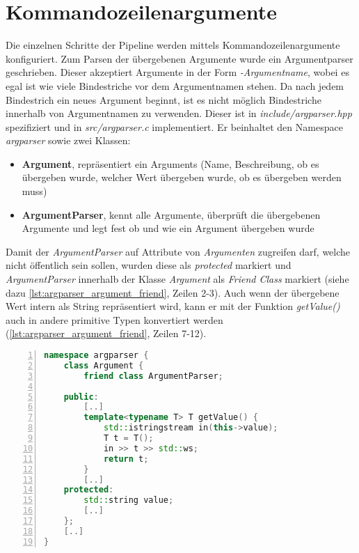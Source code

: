 \section{Kommandozeilenargumente}
Die einzelnen Schritte der Pipeline werden mittels Kommandozeilenargumente konfiguriert.
Zum Parsen der übergebenen Argumente wurde ein Argumentparser geschrieben.
Dieser akzeptiert Argumente in der Form \emph{-Argumentname}, wobei es egal ist wie viele Bindestriche vor dem Argumentnamen stehen.
Da nach jedem Bindestrich ein neues Argument beginnt, ist es nicht möglich Bindestriche innerhalb von Argumentnamen zu verwenden.
Dieser ist in \emph{include/argparser.hpp} spezifiziert und in \emph{src/argparser.c} implementiert.
Er beinhaltet den Namespace \emph{argparser} sowie zwei Klassen:
\begin{itemize}
\item \textbf{Argument}, repräsentiert ein Arguments (Name, Beschreibung, ob es übergeben wurde, welcher Wert übergeben wurde, ob es übergeben werden muss)
\item \textbf{ArgumentParser}, kennt alle Argumente, überprüft die übergebenen Argumente und legt fest ob und wie ein Argument übergeben wurde
\end{itemize}

Damit der \emph{ArgumentParser} auf Attribute von \emph{Argumenten} zugreifen darf, welche nicht öffentlich sein sollen, wurden diese als \emph{protected} markiert und \emph{ArgumentParser} innerhalb der Klasse \emph{Argument} als \emph{Friend Class} markiert (siehe dazu \autoref{lst:argparser_argument_friend}, Zeilen 2-3).
Auch wenn der übergebene Wert intern als String repräsentiert wird, kann er mit der Funktion \emph{getValue()} auch in andere primitive Typen konvertiert werden (\autoref{lst:argparser_argument_friend}, Zeilen 7-12).

\begin{lstlisting}[language=c++, numbers=left, breaklines=true, breakatwhitespace=false, label=lst:argparser_argument_friend]
namespace argparser {
    class Argument {
        friend class ArgumentParser;

    public:
        [..]
        template<typename T> T getValue() {
            std::istringstream in(this->value);
            T t = T();
            in >> t >> std::ws;
            return t;
        }
        [..]
    protected:
        std::string value;
        [..]
    };
    [..]
}
\end{lstlisting}

